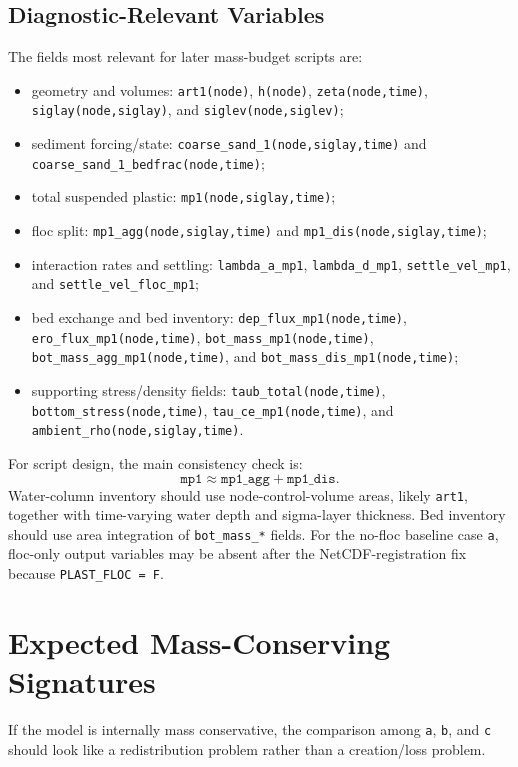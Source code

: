 \documentclass[11pt]{article}
\begin{document}
\subsection{Diagnostic-Relevant Variables}
The fields most relevant for later mass-budget scripts are:
\begin{itemize}
\item geometry and volumes: \texttt{art1(node)}, \texttt{h(node)}, \texttt{zeta(node,time)},
\texttt{siglay(node,siglay)}, and \texttt{siglev(node,siglev)};
\item sediment forcing/state: \texttt{coarse\_sand\_1(node,siglay,time)} and
\texttt{coarse\_sand\_1\_bedfrac(node,time)};
\item total suspended plastic: \texttt{mp1(node,siglay,time)};
\item floc split: \texttt{mp1\_agg(node,siglay,time)} and
\texttt{mp1\_dis(node,siglay,time)};
\item interaction rates and settling: \texttt{lambda\_a\_mp1}, \texttt{lambda\_d\_mp1},
\texttt{settle\_vel\_mp1}, and \texttt{settle\_vel\_floc\_mp1};
\item bed exchange and bed inventory: \texttt{dep\_flux\_mp1(node,time)},
\texttt{ero\_flux\_mp1(node,time)}, \texttt{bot\_mass\_mp1(node,time)},
\texttt{bot\_mass\_agg\_mp1(node,time)}, and \texttt{bot\_mass\_dis\_mp1(node,time)};
\item supporting stress/density fields: \texttt{taub\_total(node,time)}, \texttt{bottom\_stress(node,time)},
\texttt{tau\_ce\_mp1(node,time)}, and \texttt{ambient\_rho(node,siglay,time)}.
\end{itemize}

For script design, the main consistency check is:
\[
\texttt{mp1} \approx \texttt{mp1\_agg} + \texttt{mp1\_dis}.
\]
Water-column inventory should use node-control-volume areas, likely \texttt{art1}, together with
time-varying water depth and sigma-layer thickness. Bed inventory should use area integration of
\texttt{bot\_mass\_*} fields. For the no-floc baseline case \texttt{a}, floc-only output variables may be
absent after the NetCDF-registration fix because \texttt{PLAST\_FLOC = F}.

\section{Expected Mass-Conserving Signatures}
If the model is internally mass conservative, the comparison among \texttt{a}, \texttt{b}, and \texttt{c}
should look like a redistribution problem rather than a creation/loss problem.
\end{document}
